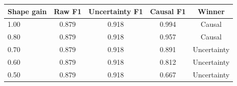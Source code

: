 \begin{tabular}{lcccc}
\toprule
Shape gain & Raw F1 & Uncertainty F1 & Causal F1 & Winner \\
\midrule
1.00 & 0.879 & 0.918 & 0.994 & Causal \\
0.80 & 0.879 & 0.918 & 0.957 & Causal \\
0.70 & 0.879 & 0.918 & 0.891 & Uncertainty \\
0.60 & 0.879 & 0.918 & 0.812 & Uncertainty \\
0.50 & 0.879 & 0.918 & 0.667 & Uncertainty \\
\bottomrule
\end{tabular}
